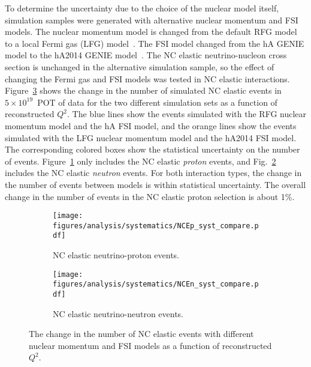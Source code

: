     To determine the uncertainty due to the choice of the nuclear model itself,
    simulation samples were generated with alternative nuclear momentum and FSI
    models. The nuclear momentum model is changed from the default RFG model to
    a local Fermi gas (LFG) model~\cite{Leitner:2008ue}. The FSI model changed
    from the hA GENIE model to the hA2014 GENIE model~\cite{Alam:2015nkk}. The
    NC elastic neutrino-nucleon cross section is unchanged in the alternative
    simulation sample, so the effect of changing the Fermi gas and FSI models
    was tested in NC elastic interactions. Figure~\ref{fig:ncfg} shows the
    change in the number of simulated NC elastic events in $5\times
    10^{19}$~POT of data for the two different simulation sets as a function of
    reconstructed $Q^2$. The blue lines show the events simulated with the RFG
    nuclear momentum model and the hA FSI model, and the orange lines show the
    events simulated with the LFG nuclear momentum model and the hA2014 FSI
    model. The corresponding colored boxes show the statistical uncertainty on
    the number of events.  Figure~\ref{fig:ncfgp} only includes the NC elastic
    \textit{proton} events, and Fig.~\ref{fig:ncfgn} includes the NC elastic
    \textit{neutron} events. For both interaction types, the change in the
    number of events between models is within statistical uncertainty. The
    overall change in the number of events in the NC elastic proton selection
    is about 1\%.
    \begin{figure}[h]
      \centering
      \begin{subfigure}[t]{2.8in}
        \texttt{[image: figures/analysis/systematics/NCEp\_syst\_compare.pdf]}
        \caption{NC elastic neutrino-proton events.}
        \label{fig:ncfgp}
      \end{subfigure}
      \hspace{2pt}
      \begin{subfigure}[t]{2.8in}
        \texttt{[image: figures/analysis/systematics/NCEn\_syst\_compare.pdf]}
        \caption{NC elastic neutrino-neutron events.}
        \label{fig:ncfgn}
      \end{subfigure}
      \caption{The change in the number of NC elastic events with different
      nuclear momentum and FSI models as a function of reconstructed $Q^2$.}
      \label{fig:ncfg}
    \end{figure}

